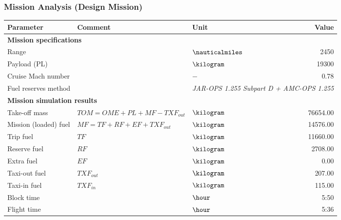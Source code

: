 
\begin{frame}
 \frametitle{Mission Analysis (Design Mission)}

 \begin{table}
     \centering
     \scriptsize
     \begin{tabularx}{250pt}{Xllr}
         \toprule
         \textcolor{ilrdark}{Parameter} & \textcolor{ilrdark}{Comment} & \textcolor{ilrdark}{Unit} & \textcolor{ilrdark}{Value} \\
         \midrule[0.5pt]
         \multicolumn{4}{l}{\textbf{Mission specifications}}\\
         \midrule[0.5pt]
             Range                 & & $\nauticalmiles$        & 2450 \\ 
             Payload (PL)          & & $\kilogram$                & 19300 \\ 
             Cruise Mach number &             & $-$                & 0.78 \\ 
             Fuel reserves method &      &  \multicolumn{2}{c}{\textit{JAR-OPS 1.255 Subpart D + AMC-OPS 1.255}} \\
         \midrule[0.5pt]
         \multicolumn{4}{l}{\textbf{Mission simulation results}}\\
         \midrule[0.5pt]
             Take-off mass & \tiny{$TOM = OME + PL + MF - TXF_{out}$} & $\kilogram$ & 76654.00 \\ 
             Mission (loaded) fuel  &\tiny{$MF = TF + RF + EF + TXF_{out}$}  & $\kilogram$   & 14576.00 \\ 
             Trip fuel      & \tiny{$TF$}        & $\kilogram$   & 11660.00 \\ 
             Reserve fuel   & \tiny{$RF$}        & $\kilogram$   & 2708.00 \\ 
             Extra fuel     & \tiny{$EF$}        & $\kilogram$   & 0.00 \\ 
             Taxi-out fuel  & \tiny{$TXF_{out}$} & $\kilogram$   & 207.00 \\ 
             Taxi-in fuel   & \tiny{$TXF_{in}$}  & $\kilogram$   & 115.00 \\ 
             Block time             && $\hour$              & 5:50 \\ 
             Flight time              && $\hour$                  & 5:36 \\ 
        \bottomrule
    \end{tabularx}
 \end{table}

\end{frame}
